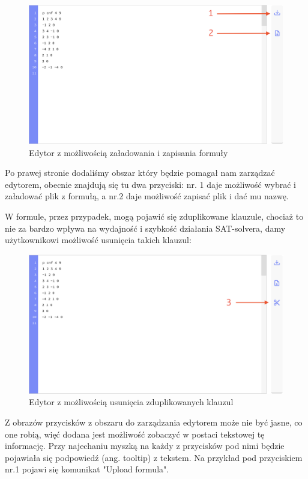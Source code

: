 \documentclass[a4paper,12pt,oneside]{book}
\theoremstyle{definition}
\begin{document}
\begin{figure}[ht]
    \centering
    \includegraphics[width=14.30cm]{2}
    \caption{Edytor z możliwością załadowania i zapisania formuły}
    \label{fig:2}
\end{figure}

\noindent Po prawej stronie dodaliśmy obszar który będzie pomagał nam zarządzać edytorem, obecnie znajdują się tu dwa przyciski: nr. 1 daje możliwość wybrać i załadować plik z formułą, a nr.2 daje możliwość zapisać plik i dać mu nazwę.

W formule, przez przypadek, mogą pojawić się zduplikowane klauzule, chociaż to nie za bardzo wpływa na wydajność i szybkość działania SAT-solvera, damy użytkownikowi możliwość usunięcia takich klauzul:

\begin{figure}[ht]
    \centering
    \includegraphics[width=14.30cm]{3}
    \caption{Edytor z możliwością usunięcia zduplikowanych klauzul}
    \label{fig:3}
\end{figure}

Z obrazów przycisków z obszaru do zarządzania edytorem może nie być jasne, co one robią, więć dodana jest możliwość zobaczyć w postaci tekstowej tę informację. Przy najechaniu myszką na każdy z przycisków pod nimi będzie pojawiała się podpowiedź (ang. tooltip) z tekstem. Na przykład pod przyciskiem nr.1 pojawi się komunikat "Upload formula".
\end{document}
